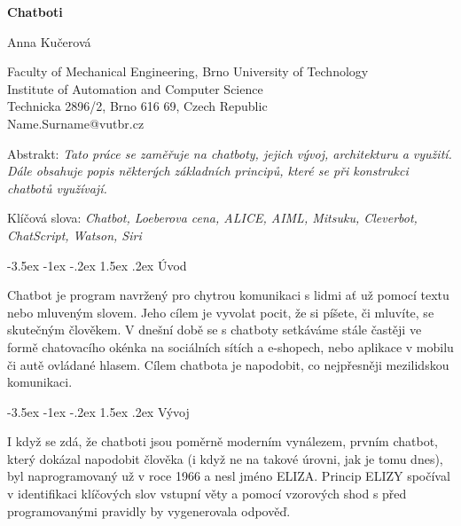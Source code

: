 \documentclass[a4paper,10pt]{article}
\makeatletter
\theoremstyle{definition}
\renewcommand\section{\@startsection {section}{1}{\z@}%
                                   {-3.5ex \@plus -1ex \@minus -.2ex}%
                                   {1.5ex \@plus.2ex}%
                                   {\large\bfseries}}
\makeatother
\begin{document}
\pagestyle{empty}

\renewcommand{\figurename}{Obr.}
\renewcommand{\tablename}{Tab.}

\begin{center}
{\bf \Large Chatboti}
\end{center}

\smallskip
\begin{center}
{\large Anna Kučerová}
\end{center}

\smallskip
\begin{center}
Faculty of Mechanical Engineering, Brno University of Technology\\
Institute of Automation and Computer Science\\
Technicka 2896/2, Brno 616 69, Czech Republic\\
Name.Surname@vutbr.cz\\
\end{center}

\bigskip
\noindent Abstrakt: \textit{Tato práce se zaměřuje na chatboty, jejich vývoj, architekturu a využití. Dále obsahuje popis některých základních principů, které se při konstrukci chatbotů využívají.}

\vspace*{10pt} \noindent Klíčová slova: \textit{Chatbot, Loeberova cena, ALICE, AIML, Mitsuku, Cleverbot, ChatScript, Watson, Siri}

\bigskip
\section{Úvod}
\label{sec:1}

Chatbot je program navržený pro chytrou komunikaci s lidmi ať už pomocí textu nebo mluveným slovem. Jeho cílem je vyvolat pocit, že si píšete, či mluvíte, se skutečným člověkem. V dnešní době se s chatboty setkáváme stále častěji ve formě chatovacího okénka na sociálních sítích a e-shopech, nebo aplikace v mobilu či autě ovládané hlasem. Cílem chatbota je napodobit, co nejpřesněji mezilidskou komunikaci. 

\section{Vývoj}
\label{sec:2}

I když se zdá, že chatboti jsou poměrně moderním vynálezem, prvním chatbot, který dokázal napodobit člověka (i když ne na takové úrovni, jak je tomu dnes), byl naprogramovaný už v roce 1966 a nesl jméno ELIZA. Princip ELIZY spočíval v identifikaci klíčových slov vstupní věty a pomocí vzorových shod s před programovanými pravidly by vygenerovala odpověď.
\end{document}
